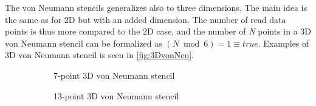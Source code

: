The von Neumann stencils generalizes also to three dimensions.
The main idea is the same as for 2D but with an added dimension.
The number of read data points is thus more compared to the 2D case, and the number of \textit{N} points in a 3D von Neumann stencil can be formalized as $(N\bmod 6)=1\equiv true$.
Examples of 3D von Neumann stencil is seen in \autoref{fig:3DvonNeu}.
\begin{figure}[ht]
	\centering
	\begin{subfigure}{.33\textwidth}
		\centering
		\caption{7-point 3D von Neumann stencil}
		\label{fig:7p3DNeu}
	\end{subfigure}%
	\begin{subfigure}{.33\textwidth}
		\centering
		\caption{13-point 3D von Neumann stencil}
		\label{fig:13p3DNeu}
	\end{subfigure}
	\begin{subfigure}{.33\textwidth}
		\centering
\end{subfigure}
\end{figure}
